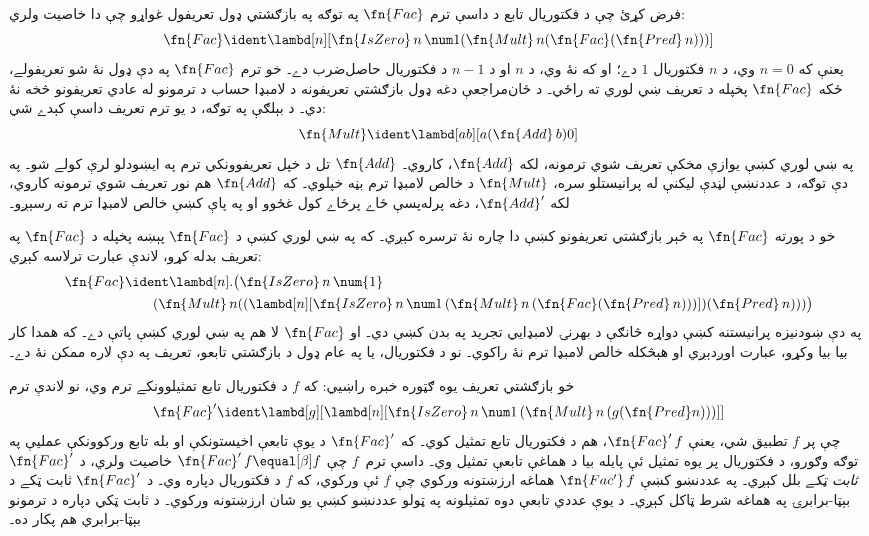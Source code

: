\documentclass[../../../include/open-logic-section]{subfiles}
\begin{document}


فرض کړئ چې د فکتوريال تابع د داسې ترم $\fn{Fac}$ په توګه
په بازګشتي ډول تعريفول غواړو چې دا خاصيت ولري:
\[
\fn{Fac} \ident \lambd[n][\fn{IsZero}\, n\, \num 1 (\fn{Mult}\, n (\fn{Fac}(\fn{Pred} \, n)))]
\]
يعنې که $n = 0$ وي، د $n$ فکتوريال $1$ دے؛ او که نۀ وي،
د $n$ او د $n-1$ د فکتوريال حاصل‌ضرب دے۔ خو ترم
$\fn{Fac}$ په دې ډول نۀ شو تعريفولے، ځکه $\fn{Fac}$
پخپله د تعريف ښي لوري ته راځي۔ د ځان‌مراجعې دغه ډول
بازګشتي تعريفونه د لامبډا حساب د ترمونو له عادي
تعريفونو څخه نۀ دي۔ د بېلګې په توګه، د يو ترم تعريف
داسې کېدے شي:
\[
\fn{Mult} \ident \lambd[ab][a (\fn{Add}\, b) 0]
\]
په ښي لوري کښې يوازې مخکې تعريف شوي ترمونه، لکه
$\fn{Add}$، کاروي۔ $\fn{Add}$ تل د خپل تعريفوونکي
ترم په ايښودلو لرې کولے شو۔ په دې توګه، د عددنښې
لڼدې ليکنې له پرانيستلو سره، $\fn{Mult}$ د خالص
لامبډا ترم بڼه خپلوي۔ که $\fn{Add}$ هم نور تعريف شوي
ترمونه کاروي، لکه $\fn{Add}'$، دغه پرله‌پسې ځاے پرځاے
کول غځوو او په پاې کښې خالص لامبډا ترم ته رسېږو۔

خو د پورته $\fn{Fac}$ په څېر بازګشتي تعريفونو کښې دا
چاره نۀ ترسره کېږي۔ که په ښي لوري کښې د $\fn{Fac}$
پېښه پخپله د $\fn{Fac}$ په تعريف بدله کړو، لاندې
عبارت ترلاسه کېږي:
\begin{align*}
  \fn{Fac} & \ident \lambd[n].\bigl(\fn{IsZero}\, n\, \num{1} \\
    & \qquad (\fn{Mult}\, n
  ((\lambd[n][\fn{IsZero} \, n \, \num 1\, (\fn{Mult}\, n\, (\fn{Fac}
    (\fn{Pred}\, n)))]) (\fn{Pred}\, n)))\bigr)
\end{align*}
په دې ښودنيزه پرانيستنه کښې دواړه څانګې د بهرنۍ لامبډايي تجريد په بدن کښې دي۔
او $\fn{Fac}$ لا هم په ښي لوري کښې پاتې دے۔ که همدا
کار بيا بيا وکړو، عبارت اوږدېږي او هېڅکله خالص
لامبډا ترم نۀ راکوي۔ نو د فکتوريال، يا په عام ډول د
بازګشتي تابعو، تعريف په دې لاره ممکن نۀ دے۔

خو بازګشتي تعريف يوه ګټوره خبره راښيي: که $f$ د
فکتوريال تابع تمثيلوونکے ترم وي، نو لاندې ترم
\[
\fn{Fac}' \ident \lambd[g][\lambd[n][\fn{IsZero} \, n \, \num 1\, (\fn{Mult} \, n\, (g (\fn{Pred} n)))]]
\]
چې پر $f$ تطبيق شي، يعنې $\fn{Fac}'\,f$، هم د
فکتوريال تابع تمثيل کوي۔ که $\fn{Fac}'$ د يوې تابعې
اخيستونکې او بله تابع ورکوونکې عمليې په توګه وګورو،
د فکتوريال پر يوه تمثيل ئې پايله بيا د هماغې تابعې
تمثيل وي۔ داسې ترم~$f$ چې $\fn{Fac}' \, f \equal[\beta] f$
خاصيت ولري، د $\fn{Fac}'$ \emph{ثابت ټکے} بلل کېږي۔
په عددنښو کښې $\fn{Fac'}\, f$ هماغه ارزښتونه ورکوي چې $f$ ئې ورکوي، که $f$ د فکتوريال دپاره وي۔ د $\fn{Fac}'$ ثابت ټکے د بېټا-برابرۍ په هماغه شرط ټاکل کېږي۔
د يوې عددي تابعې دوه تمثيلونه په ټولو عددنښو کښې يو شان ارزښتونه ورکوي۔ د ثابت ټکي دپاره د ترمونو بېټا-برابري هم پکار ده۔
\end{document}
